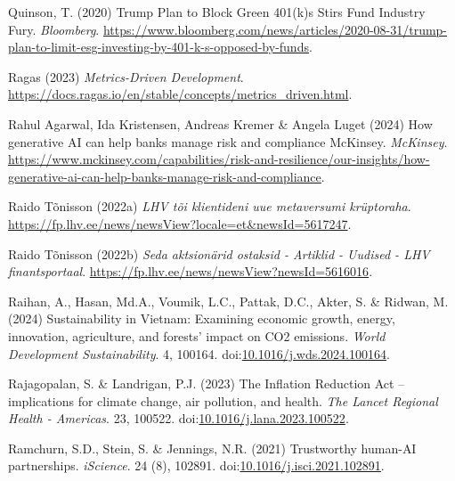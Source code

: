 \documentclass[
  letterpaper,
  DIV=11,
  numbers=noendperiod]{scrartcl}
\newlength{\cslhangindent}
\newenvironment{CSLReferences}[2] %
 {\begin{list}{}{%
  \setlength{\itemindent}{0pt}
  \setlength{\leftmargin}{0pt}
  \setlength{\parsep}{0pt}
  \ifodd #1
   \setlength{\leftmargin}{\cslhangindent}
   \setlength{\itemindent}{-1\cslhangindent}
  \fi
  \setlength{\itemsep}{#2\baselineskip}}}
 {\end{list}}
\begin{document}
\begin{CSLReferences}{0}{1}
Quinson, T. (2020) Trump {Plan} to {Block Green} 401(k)s {Stirs Fund
Industry Fury}. \emph{Bloomberg}.
\url{https://www.bloomberg.com/news/articles/2020-08-31/trump-plan-to-limit-esg-investing-by-401-k-s-opposed-by-funds}.

Ragas (2023) \emph{Metrics-{Driven Development}}.
\url{https://docs.ragas.io/en/stable/concepts/metrics_driven.html}.

Rahul Agarwal, Ida Kristensen, Andreas Kremer \& Angela Luget (2024) How
generative {AI} can help banks manage risk and compliance {\textbar}
{McKinsey}. \emph{McKinsey}.
\url{https://www.mckinsey.com/capabilities/risk-and-resilience/our-insights/how-generative-ai-can-help-banks-manage-risk-and-compliance}.

Raido Tõnisson (2022a) \emph{{LHV} t{õ}i klientideni uue metaversumi
kr{ü}ptoraha}.
\url{https://fp.lhv.ee/news/newsView?locale=et&newsId=5617247}.

Raido Tõnisson (2022b) \emph{Seda aktsion{ä}rid ostaksid - {Artiklid} -
{Uudised} - {LHV} finantsportaal}.
\url{https://fp.lhv.ee/news/newsView?newsId=5616016}.

Raihan, A., Hasan, Md.A., Voumik, L.C., Pattak, D.C., Akter, S. \&
Ridwan, M. (2024) Sustainability in {Vietnam}: {Examining} economic
growth, energy, innovation, agriculture, and forests' impact on {CO2}
emissions. \emph{World Development Sustainability}. 4, 100164.
doi:\href{https://doi.org/10.1016/j.wds.2024.100164}{10.1016/j.wds.2024.100164}.

Rajagopalan, S. \& Landrigan, P.J. (2023) The {Inflation Reduction Act}
-- implications for climate change, air pollution, and health. \emph{The
Lancet Regional Health - Americas}. 23, 100522.
doi:\href{https://doi.org/10.1016/j.lana.2023.100522}{10.1016/j.lana.2023.100522}.

Ramchurn, S.D., Stein, S. \& Jennings, N.R. (2021) Trustworthy
human-{AI} partnerships. \emph{iScience}. 24 (8), 102891.
doi:\href{https://doi.org/10.1016/j.isci.2021.102891}{10.1016/j.isci.2021.102891}.


\end{CSLReferences}
\end{document}
